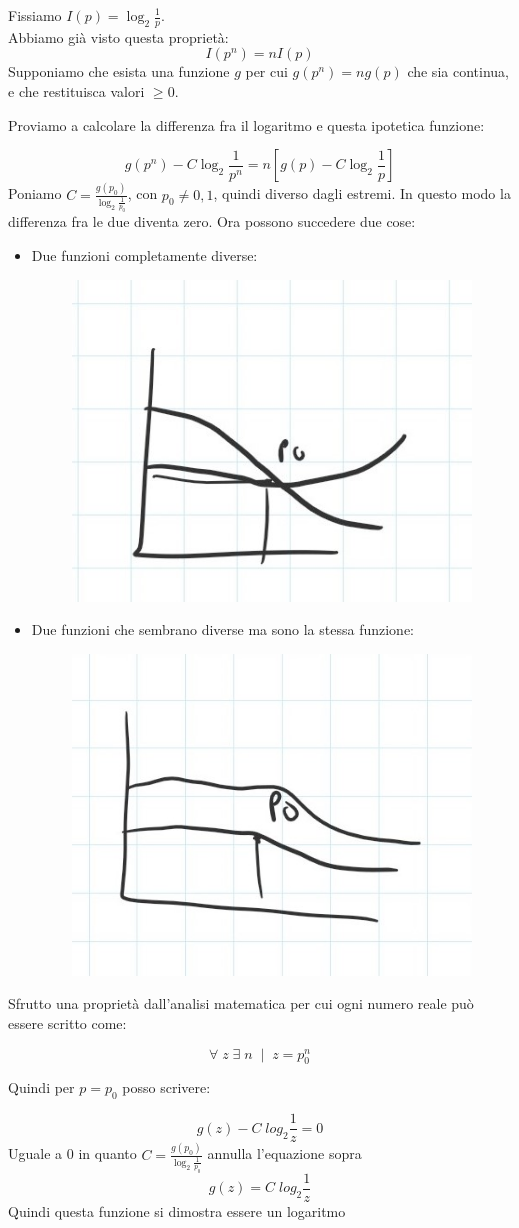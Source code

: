 \begin{dimostrazione}
Fissiamo $I(p)=\log_2\frac{1}{p}$.\\
Abbiamo già visto questa proprietà:
\begin{equation*}
I(p^n)=nI(p)
\end{equation*}
Supponiamo che esista una funzione $g$ per cui $g(p^n)=ng(p)$ che sia continua, e che restituisca valori $\geq 0$.

Proviamo a calcolare la differenza fra il logaritmo e questa ipotetica funzione:

\begin{equation*}
g(p^n) - C \log_2\frac{1}{p^n} = n[g(p)-C\log_2 \frac{1}{p}]
\end{equation*}
Poniamo $C=\frac{g(p_0)}{\log_2\frac{1}{p_0}}$, con $p_0 \neq 0, 1$, quindi diverso dagli estremi. In questo modo la differenza fra le due diventa zero.
\newpage
Ora possono succedere due cose:
\begin{itemize}
	\item Due funzioni completamente diverse:
	\begin{figure}[H]
		\centering
		\includegraphics[width=0.3\linewidth]{immagini/img23}
	\end{figure}
		
	\item Due funzioni che sembrano diverse ma sono la stessa funzione:
	\begin{figure}[H]
		\centering
		\includegraphics[width=0.3\linewidth]{immagini/img24}
	\end{figure}
\end{itemize}

Sfrutto una proprietà dall'analisi matematica per cui ogni numero reale può essere scritto come:

\begin{equation*}
\forall \; z \; \exists \; n \; \; | \; \; z=p_0^n
\end{equation*}

Quindi per $p=p_0$ posso scrivere:

\begin{equation*}
g(z) - C \; log_2\frac{1}{z} = 0
\end{equation*}
Uguale a 0 in quanto $C=\frac{g(p_0)}{\log_2\frac{1}{p_0}}$ annulla l'equazione sopra
\begin{equation*}
g(z) = C \; log_2\frac{1}{z}
\end{equation*}
Quindi questa funzione si dimostra essere un logaritmo
\end{dimostrazione}  

